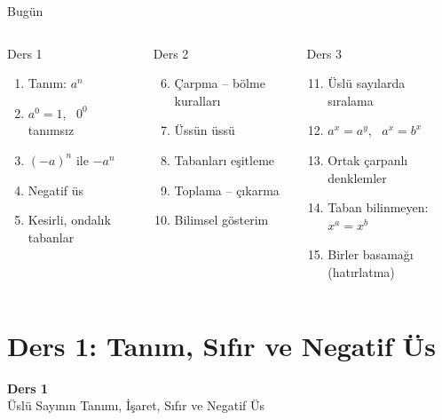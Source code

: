 \documentclass[aspectratio=169,11pt]{beamer}
\begin{document}
\begin{frame}{Bugün}
\begin{columns}[t]
\begin{block}{Ders 1}
\begin{enumerate}
\item Tanım: \(a^n\)
\item \(a^0=1\), \ \(0^0\) tanımsız
\item \((-a)^n\) ile \(-a^n\)
\item Negatif üs
\item Kesirli, ondalık tabanlar
\end{enumerate}
\end{block}
\begin{block}{Ders 2}
\begin{enumerate}\setcounter{enumi}{5}
\item Çarpma -- bölme kuralları
\item Üssün üssü
\item Tabanları eşitleme
\item Toplama -- çıkarma
\item Bilimsel gösterim
\end{enumerate}
\end{block}
\begin{block}{Ders 3}
\begin{enumerate}\setcounter{enumi}{10}
\item Üslü sayılarda sıralama
\item \(a^x=a^y\), \ \(a^x=b^x\)
\item Ortak çarpanlı denklemler
\item Taban bilinmeyen: \(x^a=x^b\)
\item Birler basamağı (hatırlatma)
\end{enumerate}
\end{block}
\end{columns}
\end{frame}

\section{Ders 1: Tanım, Sıfır ve Negatif Üs}
\begin{frame}
\centering\Large\color{anamavi}\textbf{Ders 1}\\[6pt]\normalsize Üslü Sayının Tanımı, İşaret, Sıfır ve Negatif Üs
\end{frame}
\end{document}

